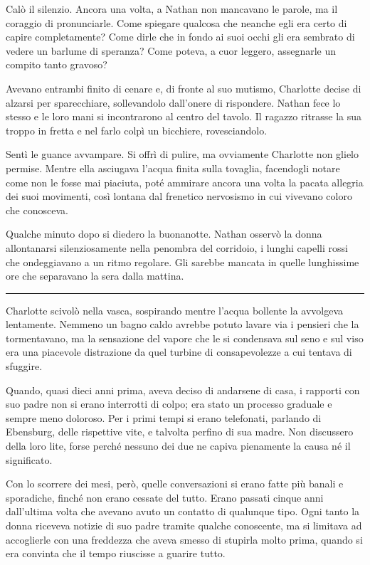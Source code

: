 \documentclass[a4paper,oneside,11pt]{memoir}
\begin{document}
Calò il silenzio. Ancora una volta, a Nathan non mancavano le parole, ma il
coraggio di pronunciarle. Come spiegare qualcosa che neanche egli era certo di
capire completamente? Come dirle che in fondo ai suoi occhi gli era sembrato di
vedere un barlume di speranza? Come poteva, a cuor leggero, assegnarle un
compito tanto gravoso?

Avevano entrambi finito di cenare e, di fronte al suo mutismo, Charlotte decise
di alzarsi per sparecchiare, sollevandolo dall'onere di rispondere. Nathan fece
lo stesso e le loro mani si incontrarono al centro del tavolo. Il ragazzo
ritrasse la sua troppo in fretta e nel farlo colpì un bicchiere, rovesciandolo.

Sentì le guance avvampare. Si offrì di pulire, ma ovviamente Charlotte non
glielo permise. Mentre ella asciugava l'acqua finita sulla tovaglia, facendogli
notare come non le fosse mai piaciuta, poté ammirare ancora una volta la pacata
allegria dei suoi movimenti, così lontana dal frenetico nervosismo in cui
vivevano coloro che conosceva.

Qualche minuto dopo si diedero la buonanotte. Nathan osservò la donna
allontanarsi silenziosamente nella penombra del corridoio, i lunghi capelli
rossi che ondeggiavano a un ritmo regolare. Gli sarebbe mancata in quelle
lunghissime ore che separavano la sera dalla mattina.

\plainbreak{1}

Charlotte scivolò nella vasca, sospirando mentre l'acqua bollente la avvolgeva
lentamente. Nemmeno un bagno caldo avrebbe potuto lavare via i pensieri che la
tormentavano, ma la sensazione del vapore che le si condensava sul seno e sul
viso era una piacevole distrazione da quel turbine di consapevolezze a cui
tentava di sfuggire.

Quando, quasi dieci anni prima, aveva deciso di andarsene di casa, i rapporti
con suo padre non si erano interrotti di colpo; era stato un processo graduale e
sempre meno doloroso. Per i primi tempi si erano telefonati, parlando di
Ebensburg, delle rispettive vite, e talvolta perfino di sua madre. Non
discussero della loro lite, forse perché nessuno dei due ne capiva pienamente la
causa né il significato.

Con lo scorrere dei mesi, però, quelle conversazioni si erano fatte più banali e
sporadiche, finché non erano cessate del tutto. Erano passati cinque anni
dall'ultima volta che avevano avuto un contatto di qualunque tipo. Ogni tanto la
donna riceveva notizie di suo padre tramite qualche conoscente, ma si limitava
ad accoglierle con una freddezza che aveva smesso di stupirla molto prima,
quando si era convinta che il tempo riuscisse a guarire tutto.
\end{document}
